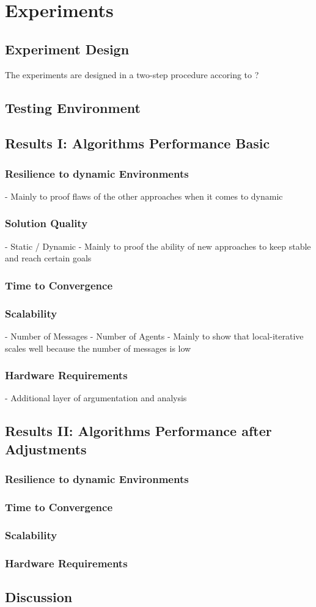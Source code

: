 \chapter{Experiments}
\section{Experiment Design}
The experiments are designed in a two-step procedure accoring to ?

\section{Testing Environment}

\section{Results I: Algorithms Performance Basic}

\subsection{Resilience to dynamic Environments}
- Mainly to proof flaws of the other approaches when it comes to dynamic
\subsection{Solution Quality}
- Static / Dynamic
- Mainly to proof the ability of new approaches to keep stable and reach certain goals
\subsection{Time to Convergence}

\subsection{Scalability}
-  Number of Messages
- Number of Agents
- Mainly to show that local-iterative scales well because the number of messages is low
\subsection{Hardware Requirements}
- Additional layer of argumentation and analysis

\section{Results II: Algorithms Performance after Adjustments}

\subsection{Resilience to dynamic Environments}
\subsection{Time to Convergence}
\subsection{Scalability}
\subsection{Hardware Requirements}

\section{Discussion}